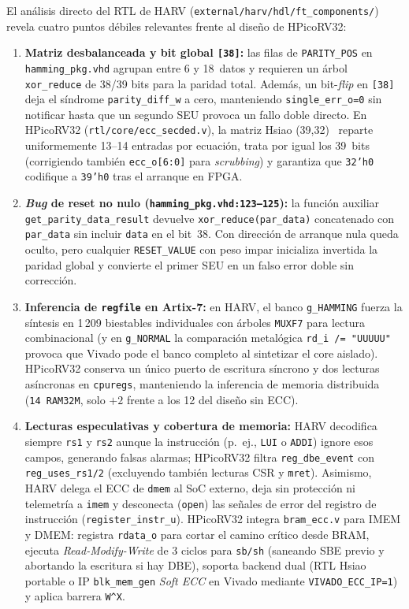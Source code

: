 \documentclass[a4paper,10pt]{article}
\begin{document}
El análisis directo del RTL de HARV (\texttt{external/harv/hdl/ft\_components/}) revela cuatro puntos débiles relevantes frente al diseño de HPicoRV32:
\begin{enumerate}
  \item \textbf{Matriz desbalanceada y bit global \texttt{[38]}:} las filas de \texttt{PARITY\_POS} en \texttt{hamming\_pkg.vhd} agrupan entre 6 y 18~datos y requieren un árbol \texttt{xor\_reduce} de 38/39 bits para la paridad total. Además, un bit-\textit{flip} en \texttt{[38]} deja el síndrome \texttt{parity\_diff\_w} a cero, manteniendo \texttt{single\_err\_o=0} sin notificar hasta que un segundo SEU provoca un fallo doble directo. En HPicoRV32 (\texttt{rtl/core/ecc\_secded.v}), la matriz Hsiao (39,32)~\cite{hsiao1970} reparte uniformemente 13--14 entradas por ecuación, trata por igual los 39~bits (corrigiendo también \texttt{ecc\_o[6:0]} para \textit{scrubbing}) y garantiza que \texttt{32'h0} codifique a \texttt{39'h0} tras el arranque en FPGA.
  \item \textbf{\textit{Bug} de reset no nulo (\texttt{hamming\_pkg.vhd:123--125}):} la función auxiliar \texttt{get\_parity\_data\_result} devuelve \texttt{xor\_reduce(par\_data)} concatenado con \texttt{par\_data} sin incluir \texttt{data} en el bit~38. Con dirección de arranque nula queda oculto, pero cualquier \texttt{RESET\_VALUE} con peso impar inicializa invertida la paridad global y convierte el primer SEU en un falso error doble sin corrección.
  \item \textbf{Inferencia de \texttt{regfile} en Artix-7:} en HARV, el banco \texttt{g\_HAMMING} fuerza la síntesis en 1\,209 biestables individuales con árboles \texttt{MUXF7} para lectura combinacional (y en \texttt{g\_NORMAL} la comparación metalógica \texttt{rd\_i /= "UUUUU"} provoca que Vivado pode el banco completo al sintetizar el core aislado). HPicoRV32 conserva un único puerto de escritura síncrono y dos lecturas asíncronas en \texttt{cpuregs}, manteniendo la inferencia de memoria distribuida (\texttt{14~RAM32M}, solo $+2$ frente a los 12 del diseño sin ECC).
  \item \textbf{Lecturas especulativas y cobertura de memoria:} HARV decodifica siempre \texttt{rs1} y \texttt{rs2} aunque la instrucción (p.~ej., \texttt{LUI} o \texttt{ADDI}) ignore esos campos, generando falsas alarmas; HPicoRV32 filtra \texttt{reg\_dbe\_event} con \texttt{reg\_uses\_rs1/2} (excluyendo también lecturas CSR y \texttt{mret}). Asimismo, HARV delega el ECC de \texttt{dmem} al SoC externo, deja sin protección ni telemetría a \texttt{imem} y desconecta (\texttt{open}) las señales de error del registro de instrucción (\texttt{register\_instr\_u}). HPicoRV32 integra \texttt{bram\_ecc.v} para IMEM y DMEM: registra \texttt{rdata\_o} para cortar el camino crítico desde BRAM, ejecuta \textit{Read-Modify-Write} de 3 ciclos para \texttt{sb/sh} (saneando SBE previo y abortando la escritura si hay DBE), soporta backend dual (RTL Hsiao portable o IP \texttt{blk\_mem\_gen} \textit{Soft ECC} en Vivado mediante \texttt{VIVADO\_ECC\_IP=1}) y aplica barrera \texttt{W\^{}X}.
\end{enumerate}
\end{document}
